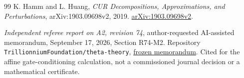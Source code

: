 \begin{thebibliography}{99}
K. Hamm and L. Huang,
\emph{CUR Decompositions, Approximations, and Perturbations},
arXiv:1903.09698v2, 2019.
\href{https://arxiv.org/abs/1903.09698v2}{arXiv:1903.09698v2}.

\emph{Independent referee report on A2, revision 74},
author-requested AI-assisted memorandum, September 17, 2026,
Section R74-M2. Repository
\texttt{Trillionnium\allowbreak Foundation/\allowbreak theta-theory},
\href{https://github.com/TrillionniumFoundation/theta-theory/blob/1ad828fd3cec7d39881fa4bb31d14423c4fd35da/reviews/a2-v74-independent-harsh-top4-2026-09-17/REFEREE_REPORT.md}{frozen memorandum}.
Cited for the affine gate-conditioning calculation, not a commissioned
journal decision or a mathematical certificate.

\end{thebibliography}

